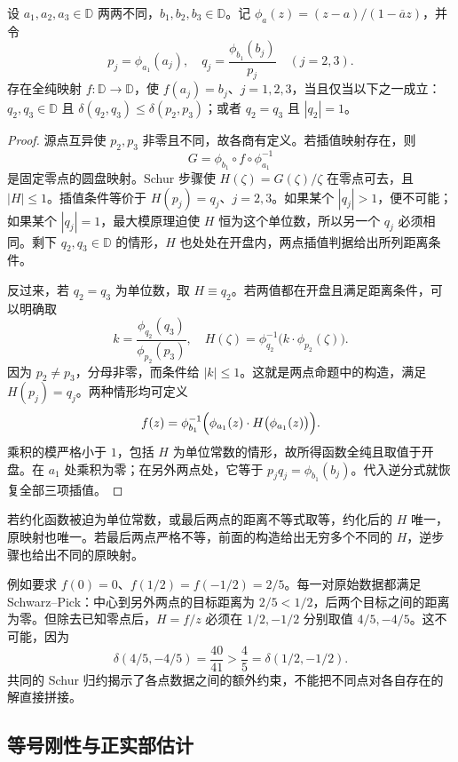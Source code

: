 \begin{proposition}\label{b3:prop:06-three-point-reduction}
设 \(a_1,a_2,a_3\in\mathbb D\) 两两不同，\(b_1,b_2,b_3\in\mathbb D\)。记 \(\phi_a(z)=(z-a)/(1-\overline a z)\)，并令
\[
 p_j=\phi_{a_1}(a_j),\quad
 q_j=\frac{\phi_{b_1}(b_j)}{p_j}\quad(j=2,3).
\]
存在全纯映射 \(f:\mathbb D\rightarrow\mathbb D\)，使 \(f(a_j)=b_j\)、\(j=1,2,3\)，当且仅当以下之一成立：\(q_2,q_3\in\mathbb D\) 且 \(\delta(q_2,q_3)\le\delta(p_2,p_3)\)；或者 \(q_2=q_3\) 且 \(|q_2|=1\)。
\end{proposition}
\begin{proof}
源点互异使 \(p_2,p_3\) 非零且不同，故各商有定义。若插值映射存在，则
\[
 G=\phi_{b_1}\circ f\circ\phi_{a_1}^{-1}
\]
是固定零点的圆盘映射。Schur 步骤使 \(H(\zeta)=G(\zeta)/\zeta\) 在零点可去，且 \(|H|\le1\)。插值条件等价于 \(H(p_j)=q_j\)、\(j=2,3\)。如果某个 \(|q_j|>1\)，便不可能；如果某个 \(|q_j|=1\)，最大模原理迫使 \(H\) 恒为这个单位数，所以另一个 \(q_j\) 必须相同。剩下 \(q_2,q_3\in\mathbb D\) 的情形，\(H\) 也处处在开盘内，两点插值判据给出所列距离条件。

反过来，若 \(q_2=q_3\) 为单位数，取 \(H\equiv q_2\)。若两值都在开盘且满足距离条件，可以明确取
\[
 k=\frac{\phi_{q_2}(q_3)}{\phi_{p_2}(p_3)},
 \quad H(\zeta)=\phi_{q_2}^{-1}\bigl(k\cdot\phi_{p_2}(\zeta)\bigr).
\]
因为 \(p_2\ne p_3\)，分母非零，而条件给 \(|k|\le1\)。这就是两点命题中的构造，满足 \(H(p_j)=q_j\)。两种情形均可定义
\[
 f(z)=\phi_{b_1}^{-1}\Bigl(
       \phi_{a_1}(z)\cdot H\bigl(\phi_{a_1}(z)\bigr)\Bigr).
\]
乘积的模严格小于 \(1\)，包括 \(H\) 为单位常数的情形，故所得函数全纯且取值于开盘。在 \(a_1\) 处乘积为零；在另外两点处，它等于 \(p_jq_j=\phi_{b_1}(b_j)\)。代入逆分式就恢复全部三项插值。
\end{proof}

若约化函数被迫为单位常数，或最后两点的距离不等式取等，约化后的 \(H\) 唯一，原映射也唯一。若最后两点严格不等，前面的构造给出无穷多个不同的 \(H\)，逆步骤也给出不同的原映射。

\ProseParagraphBreak

例如要求 \(f(0)=0\)、\(f(1/2)=f(-1/2)=2/5\)。每一对原始数据都满足 Schwarz--Pick：中心到另外两点的目标距离为 \(2/5<1/2\)，后两个目标之间的距离为零。但除去已知零点后，\(H=f/z\) 必须在 \(1/2,-1/2\) 分别取值 \(4/5,-4/5\)。这不可能，因为
\[
 \delta(4/5,-4/5)=\frac{40}{41}
 >\frac45=\delta(1/2,-1/2).
\]
共同的 Schur 归约揭示了各点数据之间的额外约束，不能把不同点对各自存在的解直接拼接。

\subsection{等号刚性与正实部估计}
\label{b3:subsec:060303}


